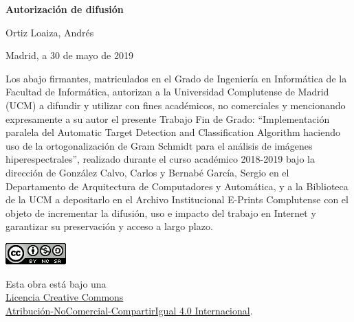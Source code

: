 
\newpage

\thispagestyle{empty}

\begin{center}

{\bf \Huge Autorización de difusión}

\vspace{1cm}


   {\large Ortiz Loaiza, Andrés}\\

   \vspace{0.5cm}

% 
   Madrid, a 30 de mayo de 2019\\

   \vspace{0.5cm} \end{center}

Los abajo firmantes, matriculados en el Grado de Ingeniería en Informática de la
Facultad de Informática, autorizan a la Universidad Complutense de Madrid (UCM) a
difundir y utilizar con fines académicos, no comerciales y mencionando
expresamente a su autor el presente Trabajo Fin de Grado: “Implementación paralela del Automatic Target Detection and Classification Algorithm haciendo uso de la ortogonalización de Gram Schmidt para el análisis de imágenes hiperespectrales”, realizado
durante el curso académico 2018-2019 bajo la dirección de González Calvo, Carlos y Bernabé García, Sergio en el Departamento de Arquitectura de Computadores y Automática, y a la
Biblioteca de la UCM a depositarlo en el Archivo Institucional E-Prints
Complutense con el objeto de incrementar la difusión, uso e impacto del trabajo
en Internet y garantizar su preservación y acceso a largo plazo.

{
\begin{center}
\vfill
\includegraphics{images/copy_right/cc-by-nc-sa.png}
\tiny

Esta obra está bajo una\\
\href{http://creativecommons.org/licenses/by-nc-sa/4.0/}{Licencia Creative Commons\\Atribución-NoComercial-CompartirIgual 4.0 Internacional}.
\end{center}
}